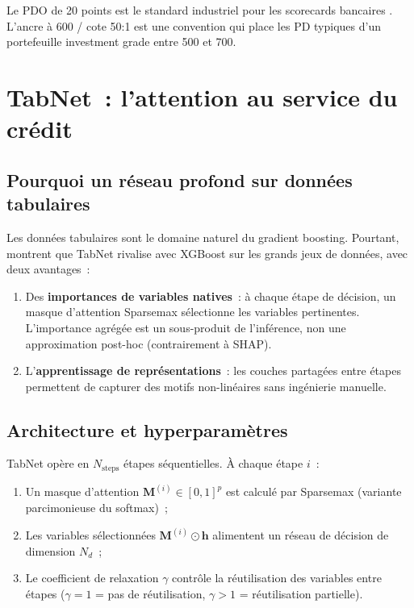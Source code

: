 \documentclass[12pt, a4paper, twoside, openright]{report}
\theoremstyle{definition}
\begin{document}
Le PDO de 20 points est le standard industriel pour les scorecards bancaires \citep{siddiqi2006}. L'ancre à 600 / cote 50:1 est une convention qui place les PD typiques d'un portefeuille investment grade entre 500 et 700.

\section{TabNet~: l'attention au service du crédit}
\label{sec:pd:tabnet}

\subsection{Pourquoi un réseau profond sur données tabulaires}

Les données tabulaires sont le domaine naturel du gradient boosting. Pourtant, \citet{arik_pfister2021} montrent que TabNet rivalise avec XGBoost sur les grands jeux de données, avec deux avantages~:
\begin{enumerate}[nosep]
  \item Des \textbf{importances de variables natives}~: à chaque étape de décision, un masque d'attention Sparsemax sélectionne les variables pertinentes. L'importance agrégée est un sous-produit de l'inférence, non une approximation post-hoc (contrairement à SHAP).
  \item L'\textbf{apprentissage de représentations}~: les couches partagées entre étapes permettent de capturer des motifs non-linéaires sans ingénierie manuelle.
\end{enumerate}

\subsection{Architecture et hyperparamètres}

TabNet opère en $N_{\text{steps}}$ étapes séquentielles. À chaque étape $i$~:
\begin{enumerate}[nosep]
  \item Un masque d'attention $\mathbf{M}^{(i)} \in [0,1]^p$ est calculé par Sparsemax (variante parcimonieuse du softmax)~;
  \item Les variables sélectionnées $\mathbf{M}^{(i)} \odot \mathbf{h}$ alimentent un réseau de décision de dimension $N_d$~;
  \item Le coefficient de relaxation $\gamma$ contrôle la réutilisation des variables entre étapes ($\gamma = 1$ = pas de réutilisation, $\gamma > 1$ = réutilisation partielle).
\end{enumerate}
\end{document}
